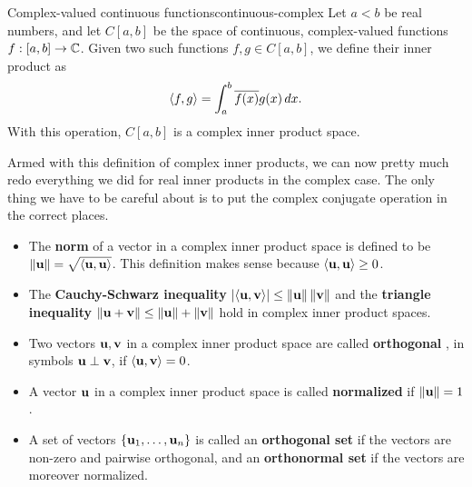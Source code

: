 \begin{example}{Complex-valued continuous functions}{continuous-complex}
  Let $a<b$ be real numbers, and let $C[a,b]$ be the space of
  continuous, complex-valued functions $f : [a,b]\to\mathbb{C}$. Given two such
  functions $f,g\in C[a,b]$, we define their inner product as
  \begin{equation*}
    \langle f,g\rangle = \int_{a}^{b} \overline{f(x)}g(x)\,dx.
  \end{equation*}
  With this operation, $C[a,b]$ is a complex inner product space.
\end{example}

Armed with this definition of complex inner products, we can now
pretty much redo everything we did for real inner products in the
complex case. The only thing we have to be careful about is to put the
complex conjugate operation in the correct places.

\begin{itemize}
\item The \textbf{norm}%
   of a vector in a complex inner
  product space is defined to be
  $\norm{\vect{u}} = \sqrt{\iprod{\vect{u},\vect{u}}}$.  This
  definition makes sense because $\iprod{\vect{u},\vect{u}}\geq 0$.
\item The \textbf{Cauchy-Schwarz inequality}%
  $\abs{\iprod{\vect{u},\vect{v}}}\leq \norm{\vect{u}}\norm{\vect{v}}$
  and the \textbf{triangle inequality}%
  $\norm{\vect{u}+\vect{v}}\leq \norm{\vect{u}} + \norm{\vect{v}}$
  hold in complex inner product spaces.
\item Two vectors $\vect{u},\vect{v}$ in a complex inner product space
  are called \textbf{orthogonal}%
  , in symbols $\vect{u}\orth\vect{v}$, if
  $\iprod{\vect{u},\vect{v}}=0$.
\item A vector $\vect{u}$ in a complex inner product space is called
  \textbf{normalized}%
   if $\norm{\vect{u}} = 1$.
\item A set of vectors $\set{\vect{u}_1,\ldots,\vect{u}_n}$ is called
  an \textbf{orthogonal set}%
   if the vectors are non-zero and pairwise
  orthogonal, and an \textbf{orthonormal set}%
   if the vectors are moreover normalized.
\end{itemize}

